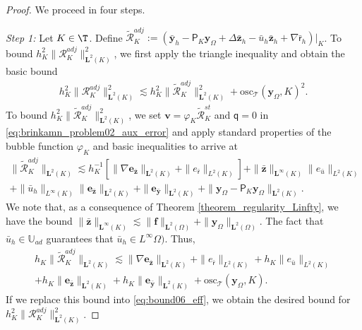 \documentclass[final]{siamart0216}
\begin{document}
\begin{proof}
We proceed in four steps.

\emph{Step 1:} Let $K\in\T$. Define $\tilde{\mathcal{R}}_{K}^{adj}:=(\bar{\mathbf{y}}_{h}-\mathsf{P}_{K}\mathbf{y}_{\Omega}+\Delta \bar{\mathbf{z}}_{h}\!-\bar{u}_{h}\bar{\mathbf{z}}_{h}\!+\!\nabla\bar{\mathsf{r}}_{h})|_K$. To bound $h_K^2\|\mathcal{R}_{K}^{adj}\|_{\mathbf{L}^2(K)}^2$, we first apply the triangle inequality and obtain the basic bound
\begin{align}\label{eq:bound06_eff}
h_K^2\|\mathcal{R}_{K}^{adj}\|_{\mathbf{L}^2(K)}^2\lesssim h_K^2 \|\tilde{\mathcal{R}}_{K}^{adj}\|_{\mathbf{L}^2(K)}^2 + \text{osc}_{\mathscr{T}}(\mathbf{y}_{\Omega},K)^2.
\end{align}
To bound $h_K^2 \|\tilde{\mathcal{R}}_{K}^{adj}\|_{\mathbf{L}^2(K)}^2$, we set $\mathbf{v}=\varphi_K \tilde{\mathcal{R}}_{K}^{st}$ and $\mathsf{q}=0$ in \eqref{eq:brinkamn_problem02_aux_error} and apply standard properties of the bubble function $\varphi_K$ and basic inequalities to arrive at 
\begin{multline}\label{eq:bound07_eff}
\|\tilde{\mathcal{R}}_{K}^{adj}\|_{\mathbf{L}^2(K)} \lesssim h_{K}^{-1} \left[
\|\nabla \mathbf{e}_{\bar{\mathbf{z}}}\|_{\mathbf{L}^2(K)}
+
\| e_{\bar{\mathsf{r}}} \|_{L^2(K)}
\right]
+
\|\bar{\mathbf{z}}\|_{\mathbf{L}^{\infty}(K)} \|e_{\bar{u}}\|_{L^2(K)}
\\
+
\|\bar{u}_{h}\|_{L^{\infty}(K)}\| \mathbf{e}_{\bar{\mathbf{z}}}\|_{\mathbf{L}^2(K)}+\| \mathbf{e}_{\bar{\mathbf{y}}}\|_{\mathbf{L}^2(K)}+\|\mathbf{y}_{\Omega}-\mathsf{P}_{K}\mathbf{y}_{\Omega}\|_{\mathbf{L}^2(K)}.
\end{multline}
We note that, as a consequence of Theorem \ref{theorem_regularity_Linfty}, we have the bound $\|\bar{\mathbf{z}}\|_{\mathbf{L}^{\infty}(K)}\lesssim \|\mathbf{f}\|_{\mathbf{L}^2(\Omega)}+\|\mathbf{y}_{\Omega}\|_{\mathbf{L}^2(\Omega)}$. The fact that $\bar{u}_h \in \mathbb{U}_{ad}$ guarantees that $\bar{u}_h \in L^{\infty}\Omega)$. Thus,
\begin{multline}\label{eq:bound08_eff}
h_K\|\tilde{\mathcal{R}}_{K}^{adj}\|_{\mathbf{L}^2(K)}  \lesssim  \|\nabla \mathbf{e}_{\bar{\mathbf{z}}}\|_{\mathbf{L}^2(K)}
+\| e_{\bar{\mathsf{r}}} \|_{L^2(K)}
+h_K \|e_{\bar{u}}\|_{L^2(K)}
\\+h_K\| \mathbf{e}_{\bar{\mathbf{z}}}\|_{\mathbf{L}^2(K)}+h_K\| \mathbf{e}_{\bar{\mathbf{y}}}\|_{\mathbf{L}^2(K)}+\text{osc}_{\mathscr{T}}(\mathbf{y}_{\Omega},K).
\end{multline}
If we replace this bound into \eqref{eq:bound06_eff}, we obtain the desired bound for $h_K^2 \|\mathcal{R}_{K}^{adj}\|_{\mathbf{L}^2(K)}^2$.


\end{proof}
\end{document}
